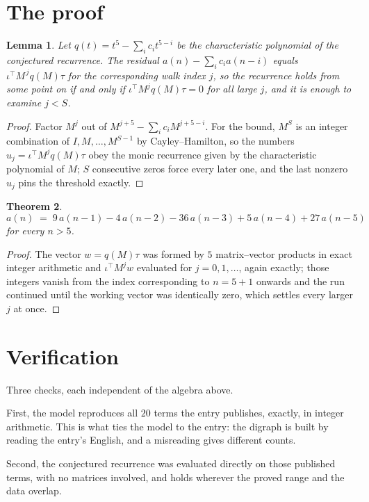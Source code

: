 \documentclass[11pt,a4paper]{article}
\theoremstyle{plain}
\newtheorem{theorem}{Theorem}
\newtheorem{lemma}[theorem]{Lemma}
\theoremstyle{definition}
\begin{document}
\section{The proof}

\begin{lemma}\label{lem:crit}
Let $q(t)=t^{5}-\sum_i c_it^{5-i}$ be the characteristic polynomial of the
conjectured recurrence. The residual $a(n)-\sum_ic_ia(n-i)$ equals
$\iota^{\!\top}M^{\,j}q(M)\tau$ for the corresponding walk index $j$, so the recurrence
holds from some point on if and only if $\iota^{\!\top}M^{j}q(M)\tau=0$ for all large $j$,
and it is enough to examine $j<S$.
\end{lemma}

\begin{proof}
Factor $M^{j}$ out of $M^{j+5}-\sum_ic_iM^{j+5-i}$. For the bound, $M^{S}$
is an integer combination of $I,M,\dots,M^{S-1}$ by Cayley--Hamilton, so the numbers
$u_j=\iota^{\!\top}M^{j}q(M)\tau$ obey the monic recurrence given by the characteristic
polynomial of $M$; $S$ consecutive zeros force every later one, and the last nonzero $u_j$
pins the threshold exactly.
\end{proof}

\begin{theorem}
\[
a(n)\;=\;9\,a(n-1) - 4\,a(n-2) - 36\,a(n-3) + 5\,a(n-4) + 27\,a(n-5)
\]
for every $n>5$.
\end{theorem}

\begin{proof}
The vector $w=q(M)\tau$ was formed by $5$ matrix--vector products in exact integer
arithmetic and $\iota^{\!\top}M^{j}w$ evaluated for $j=0,1,\dots$, again exactly; those
integers vanish from the index corresponding to $n=5+1$ onwards and the run continued
until the working vector was identically zero, which settles every larger $j$ at once.
\end{proof}

\section{Verification}

Three checks, each independent of the algebra above.

First, the model reproduces all $20$ terms the entry publishes, exactly, in integer
arithmetic. This is what ties the model to the entry: the digraph is built by reading the
entry's English, and a misreading gives different counts.

Second, the conjectured recurrence was evaluated directly on those published terms, with no
matrices involved, and holds wherever the proved range and the data overlap.
\end{document}
